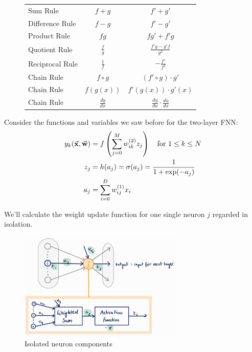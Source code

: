 \begin{table}[h]
\begin{subfigure}{0.45\textwidth}
\begin{tabular}{|l|c|c|}
    Sum Rule & $f + g$ & $f' + g'$ \\
    Difference Rule & $f - g$ & $f' - g'$ \\
    Product Rule & $fg$ & $fg' + f'g$ \\
    Quotient Rule & $\frac{f}{g}$ & $\frac{f'g - g'f}{g^2}$ \\
    Reciprocal Rule & $\frac{1}{f}$ & $-\frac{f'}{f^2}$ \\
    \hline
    Chain Rule & $f \circ g$ & $(f' \circ g) \cdot g'$ \\
    Chain Rule & $f(g(x))$ & $f'(g(x)) \cdot g'(x)$ \\
    Chain Rule & $\frac{dy}{dx}$ & $\frac{dy}{du} \cdot \frac{du}{dx}$ \\
    \hline
  \end{tabular}
\end{subfigure}
  
  \renewcommand{\arraystretch}{1}
\end{table}

Consider the functions and variables we saw before for the two-layer FNN:
\begin{align*}
  y_k(\vec{\mathbf{x}}, \vec{\mathbf{w}}) &= f\left( \sum_{j=0}^M w_{ik}^{(2)} z_j \right) \quad \textnormal{\color{black}{for }}1\leq k\leq N\\
  z_j &= h(a_j) = \sigma(a_j) = \frac{1}{1+\exp(-a_j)}\\
  a_j &= \sum_{i=0}^D w_{ij}^{(1)} x_i
\end{align*}

We'll calculate the weight update function for one single neuron $j$ regarded in isolation. 

\begin{figure}[H]
  \centering
  \includegraphics[width=0.7\textwidth]{assets/nn/bp__isolated_neuron.jpg}

  \caption{Isolated neuron components}
  \label{fig:6_bp_isolated_neuron}
\end{figure}

